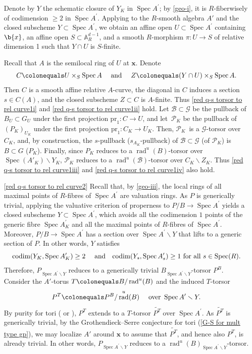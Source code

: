 \documentclass[JEP,XML,SOM,Unicode,published]{cedram}
\let\backslash\smallsetminus
\newcommand{\cP}{\mathcal{P}}
\newcommand{\sB}{\mathscr{B}}
\newcommand{\sG}{\mathscr{G}}
\let\ce\colonequals
\let\q\quad
\newcommand{\pr}{^{\prime}}
\DeclareMathOperator{\Spec}{Spec}
\DeclareMathOperator{\rad}{rad}
\DeclareMathOperator{\codim}{codim}
\theoremstyle{plain}
\theoremstyle{definition}
\begin{document}
Denote by $Y$ the schematic closure of $Y_K$ in $\Spec A\pr$; by \eqref{geo-i}, it is $R$-fiberwisely of codimension $\ge 2$ in $\Spec A\pr$.
Applying  to the $R$-smooth algebra $A'$ and the closed subscheme $Y\subset \Spec A\pr$, we obtain an affine open $U\subset \Spec A\pr$ containing $\b{x}$, an affine open $S\subset \mathbb{A}_R^{d-1}$, and a smooth $R$-morphism $\pi:U\to S$ of relative dimension 1 such that $Y\cap U$ is $S$-finite.

Recall that $A$ is the semilocal ring of $U$ at $\textbf{x}$. Denote
\[
C\ce U\times_S\Spec A \q \text{ and } \q Z\ce (Y\cap U)\times_S\Spec A.
\]
Then $C$ is a smooth affine relative $A$-curve, the diagonal in $C$ induces a section $s\in C(A)$, and the closed subscheme $Z\subset C$ is $A$-finite. Thus \eqref{red q-s torsor to rel curve1i} and \eqref{red q-s torsor to rel curve1ii} hold. Let $\sB\subset \sG$ be the pullback of $B_U\subset G_U$ under the first projection $\text{pr}_1:C\to U$, and let~$\cP_K$ be the pullback of $(P_K)_{U_K}$ under the first projection $\text{pr}_1:C_K\to U_K$.
Then, $\cP_K$~is a $\sG$-torsor over $C_K$, and, by construction, the $s$-pullback (\resp $s_{A_K}$-pullback) of $\sB\subset\sG$ (\resp of $\cP_K$) is $B\subset G$ (\resp $P_K$). Finally, since $P_K$ reduces to a $\rad^u(B)$-torsor over $\Spec (A'_K)\backslash Y_K$, $\cP_K$ reduces to a $\rad^u(\sB)$-torsor over $C_K\backslash Z_K$. Thus \eqref{red q-s torsor to rel curve1iii} and \eqref{red q-s torsor to rel curve1iv} also hold.

\eqref{red q-s torsor to rel curve2} Recall that, by \eqref{geo-iii}, the local rings of all maximal points of $R$-fibres of $\Spec A\pr$ are valuation rings. As $P$ is generically {trivial}, applying the valuative criterion of properness to $P/B\to \Spec A\pr$ yields a closed subscheme $Y\subset \Spec A\pr$, which avoids all the codimension $1$ points of the generic fibre $\Spec A\pr_K$ and all the maximal points of $R$-fibres of $\Spec A\pr$. Moreover, $P/B \to \Spec A\pr$ has a section over $\Spec A\pr\backslash Y$ that lifts to a generic section of $P$. In other words, $Y$ satisfies
\[
\text{$\codim(Y_K, \Spec A\pr_K)\geq 2$ \q and\q $\codim(Y_s,\Spec A\pr_s)\geq 1$ for all $s\in \Spec(R)$.}
\]
Therefore, $P_{\Spec A\pr\backslash Y}$ reduces to a generically trivial $B_{\Spec A\pr\backslash Y}$-torsor $P^B$. Consider the $A'$-torus $T\ce B/\rad^u(B)$ and the induced $T$-torsor
\[
P^T\ce P^B/\rad^u(B) \q \text{ over } \Spec A\pr\backslash Y.
\]
By purity for tori (\cf \cite[Th.\,3.3]{GL23} or ), $P^T$ extends to {a $T$-torsor $\widetilde{P^T}$ over $\Spec A\pr$}. As $\widetilde{P^T}$ is generically trivial, by the Grothendieck--Serre conjecture for tori (\eqref{G-S for mult type gp}), we may localize $A'$ around $\textbf{x}$ to assume that $\widetilde{P^T}$, and hence also $P^T$, is already trivial. In other words, $P_{\Spec A\pr\backslash Y}$ reduces to a $\rad^u(B)_{\Spec A\pr\backslash Y}$-torsor.
\end{document}
